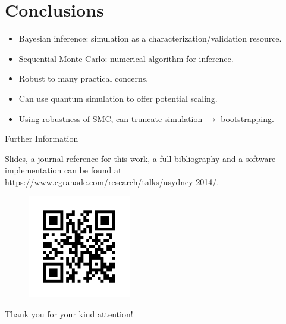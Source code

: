\documentclass[xcolor=dvipsnames, compress]{beamer}
\begin{document}
\section{Conclusions}

\begin{frame}{}

  \begin{itemize}
   \item<+-> Bayesian inference: simulation as a characterization/validation resource.
   \item<+-> Sequential Monte Carlo: numerical algorithm for inference.
   \item<+-> Robust to many practical concerns.
   \item<+-> Can use quantum simulation to offer potential scaling.
   \item<+-> Using robustness of SMC, can truncate simulation $\to$ bootstrapping.
  \end{itemize}

\end{frame}

\begin{frame}{Further Information}

  Slides, a journal reference for this work, a full bibliography and a software implementation can
  be found at \url{https://www.cgranade.com/research/talks/usydney-2014/}.

  \begin{figure}
     \includegraphics[width=0.4\textwidth]{figures/link}
  \end{figure}

  \begin{block}{}
    Thank you for your kind attention!
  \end{block}
\end{frame}


\appendix 
\end{document}
